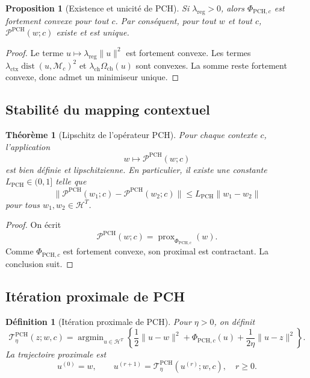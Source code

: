 \documentclass[11pt,a4paper]{article}
\newtheorem{definition}{Définition}[section]
\newtheorem{proposition}{Proposition}[section]
\newtheorem{theorem}{Théorème}[section]
\DeclareMathOperator{\prox}{prox}
\DeclareMathOperator{\argmin}{argmin}
\DeclareMathOperator{\dist}{dist}
\newcommand{\Hh}{\mathcal H}
\newcommand{\Pcal}{\mathcal P}
\newcommand{\Mcal}{\mathcal M}
\newcommand{\1}{\mathbf 1}
\begin{document}
\begin{proposition}[Existence et unicité de PCH]
Si \(\lambda_{\mathrm{reg}}>0\), alors \(\Phi_{\mathrm{PCH},c}\) est fortement convexe pour tout \(c\).  
Par conséquent, pour tout \(w\) et tout \(c\), \(\Pcal^{\mathrm{PCH}}(w;c)\) existe et est unique.
\end{proposition}

\begin{proof}
Le terme \(u\mapsto \lambda_{\mathrm{reg}}\|u\|^2\) est fortement convexe.  
Les termes \(\lambda_{\mathrm{ctx}}\dist(u,\Mcal_c)^2\) et \(\lambda_{\mathrm{ch}}\Omega_{\mathrm{ch}}(u)\) sont convexes.  
La somme reste fortement convexe, donc admet un minimiseur unique.
\end{proof}

\subsection{Stabilité du mapping contextuel}

\begin{theorem}[Lipschitz de l'opérateur PCH]
Pour chaque contexte \(c\), l'application
\[
w\longmapsto \Pcal^{\mathrm{PCH}}(w;c)
\]
est bien définie et lipschitzienne.  
En particulier, il existe une constante \(L_{\mathrm{PCH}}\in(0,1]\) telle que
\[
\|\Pcal^{\mathrm{PCH}}(w_1;c)-\Pcal^{\mathrm{PCH}}(w_2;c)\|
\le
L_{\mathrm{PCH}}\|w_1-w_2\|
\]
pour tous \(w_1,w_2\in\Hh^T\).
\end{theorem}

\begin{proof}
On écrit
\[
\Pcal^{\mathrm{PCH}}(w;c)=\prox_{\Phi_{\mathrm{PCH},c}}(w).
\]
Comme \(\Phi_{\mathrm{PCH},c}\) est fortement convexe, son proximal est contractant.  
La conclusion suit.
\end{proof}

\subsection{Itération proximale de PCH}

\begin{definition}[Itération proximale de PCH]
Pour \(\eta>0\), on définit
\[
\mathcal T^{\mathrm{PCH}}_{\eta}(z;w,c)
=
\argmin_{u\in\Hh^T}
\left\{
\frac12\|u-w\|^2+\Phi_{\mathrm{PCH},c}(u)+\frac{1}{2\eta}\|u-z\|^2
\right\}.
\]
La trajectoire proximale est
\[
u^{(0)}=w,
\qquad
u^{(r+1)}=\mathcal T^{\mathrm{PCH}}_{\eta}(u^{(r)};w,c),
\quad r\ge 0.
\]
\end{definition}
\end{document}
